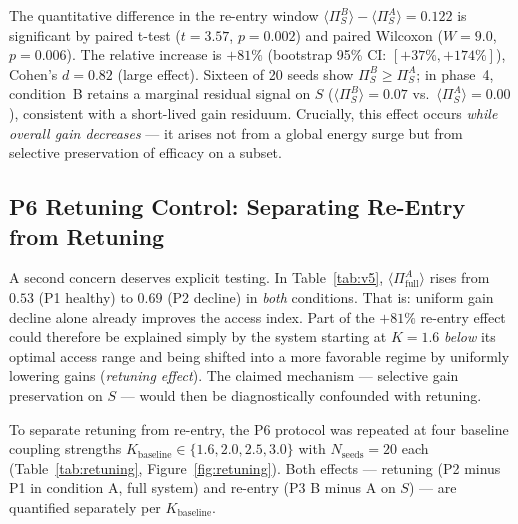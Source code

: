 ﻿\documentclass[11pt,a4paper]{article}
\theoremstyle{plain}
\theoremstyle{definition}
\theoremstyle{remark}
\begin{document}
The quantitative difference in the re-entry window $\langle\Pi_S^B\rangle - \langle\Pi_S^A\rangle = 0.122$ is significant by paired t-test ($t = 3.57$, $p = 0.002$) and paired Wilcoxon ($W = 9.0$, $p = 0.006$). The relative increase is $+81\%$ (bootstrap 95\% CI: $[+37\%, +174\%]$), Cohen's $d = 0.82$ (large effect). Sixteen of 20 seeds show $\Pi_S^B \geq \Pi_S^A$; in phase~4, condition~B retains a marginal residual signal on $S$ ($\langle\Pi_S^B\rangle = 0.07$ vs.\ $\langle\Pi_S^A\rangle = 0.00$), consistent with a short-lived gain residuum. Crucially, this effect occurs \emph{while overall gain decreases} --- it arises not from a global energy surge but from selective preservation of efficacy on a subset.

\subsection{P6 Retuning Control: Separating Re-Entry from Retuning}
\label{sec:retuning-control}

A second concern deserves explicit testing. In Table~\ref{tab:v5}, $\langle\Pi_{\mathrm{full}}^A\rangle$ rises from $0.53$ (P1 healthy) to $0.69$ (P2 decline) in \emph{both} conditions. That is: uniform gain decline alone already improves the access index. Part of the $+81\%$ re-entry effect could therefore be explained simply by the system starting at $K = 1.6$ \emph{below} its optimal access range and being shifted into a more favorable regime by uniformly lowering gains (\emph{retuning effect}). The claimed mechanism --- selective gain preservation on $S$ --- would then be diagnostically confounded with retuning.

To separate retuning from re-entry, the P6 protocol was repeated at four baseline coupling strengths $K_{\mathrm{baseline}} \in \{1.6, 2.0, 2.5, 3.0\}$ with $N_{\mathrm{seeds}} = 20$ each (Table~\ref{tab:retuning}, Figure~\ref{fig:retuning}). Both effects --- retuning (P2 minus P1 in condition A, full system) and re-entry (P3 B minus A on $S$) --- are quantified separately per $K_{\mathrm{baseline}}$.
\end{document}
